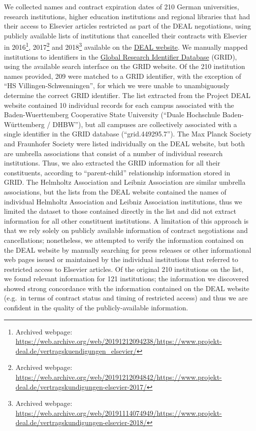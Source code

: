 \documentclass[
]{article}
\begin{document}
We collected names and contract expiration dates of 210 German universities, research institutions, higher education institutions and regional libraries that had their access to Elsevier articles restricted as part of the DEAL negotiations, using publicly available lists of institutions that cancelled their contracts with Elsevier in 2016\footnote{Archived webpage: \url{https://web.archive.org/web/20191212094238/https://www.projekt-deal.de/vertragskuendigungen_elsevier/}}, 2017\footnote{Archived webpage: \url{https://web.archive.org/web/20191212094842/https://www.projekt-deal.de/vertragskundigungen-elsevier-2017/}} and 2018\footnote{Archived webpage: \url{https://web.archive.org/web/20191114074949/https://www.projekt-deal.de/vertragskundigungen-elsevier-2018/}} available on the \href{https://www.projekt-deal.de/}{DEAL website}. We manually mapped institutions to identifiers in the \href{https://www.grid.ac/}{Global Research Identifier Database} (GRID), using the available search interface on the GRID website. Of the 210 institution names provided, 209 were matched to a GRID identifier, with the exception of ``HS Villingen-Schwenningen'', for which we were unable to unambiguously determine the correct GRID identifier. The list extracted from the Project DEAL website contained 10 individual records for each campus associated with the Baden-Wuerttemberg Cooperative State University (``Duale Hochschule Baden-Württemberg / DHBW''), but all campuses are collectively associated with a single identifier in the GRID database (``grid.449295.7''). The Max Planck Society and Fraunhofer Society were listed individually on the DEAL website, but both are umbrella associations that consist of a number of individual research institutions. Thus, we also extracted the GRID information for all their constituents, according to ``parent-child'' relationship information stored in GRID. The Helmholtz Association and Leibniz Association are similar umbrella associations, but the lists from the DEAL website contained the names of individual Helmholtz Association and Leibniz Association institutions, thus we limited the dataset to those contained directly in the list and did not extract information for all other constituent institutions. A limitation of this approach is that we rely solely on publicly available information of contract negotiations and cancellations; nonetheless, we attempted to verify the information contained on the DEAL website by manually searching for press releases or other informational web pages issued or maintained by the individual institutions that referred to restricted access to Elsevier articles. Of the original 210 institutions on the list, we found relevant information for 121 institutions; the information we discovered showed strong concordance with the information contained on the DEAL website (e.g.~in terms of contract status and timing of restricted access) and thus we are confident in the quality of the publicly-available information.
\end{document}
